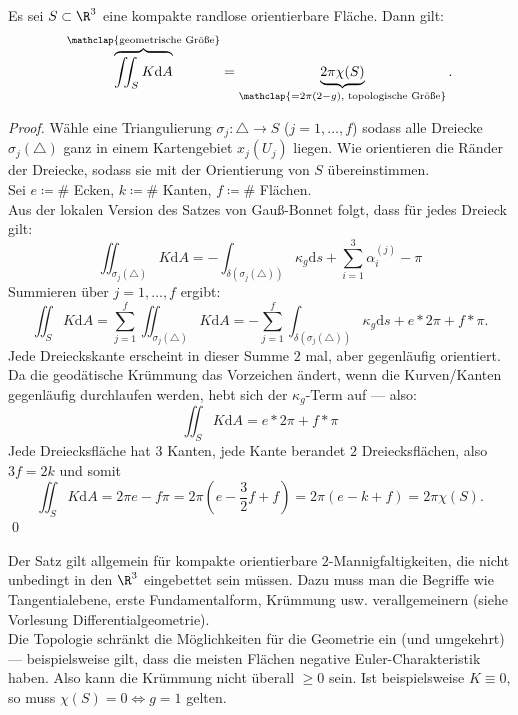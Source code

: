 \begin{theorem}
  Es sei \( S \subset \R^3 \) eine kompakte randlose orientierbare Fläche. Dann gilt:
  \begin{equation*}
    \overbrace{\iint_SK\text{d}A}^{\mathclap{\text{geometrische Größe}}} = \underbrace{2\pi\chi(S)}_{\mathclap{=2\pi(2-g)\text{, topologische Größe}}}\text{.}
  \end{equation*}
  \begin{proof}
    Wähle eine Triangulierung \( \sigma_j: \triangle \to S \) (\( j = 1,\dots,f \)) sodass alle Dreiecke \( \sigma_j(\triangle) \) ganz in einem Kartengebiet \( x_j(U_j) \) liegen. Wie orientieren die Ränder der Dreiecke, sodass sie mit der Orientierung von \( S \) übereinstimmen. \\
    Sei \( e \coloneqq \# \) Ecken, \( k \coloneqq \# \) Kanten, \( f \coloneqq \# \) Flächen. \\
    Aus der lokalen Version des Satzes von Gauß-Bonnet folgt, dass für jedes Dreieck gilt:
    \begin{equation*}
      \iint_{\sigma_j(\triangle)}K\text{d}A = -\int_{\delta(\sigma_j(\triangle))}\kappa_g\text{d}s + \sum_{i = 1}^3 \alpha_i^{(j)} - \pi
    \end{equation*}
    Summieren über \( j = 1,\dots,f \) ergibt:
    \begin{equation*}
      \iint_S K\text{d}A = \sum_{j=1}^f\iint_{\sigma_j(\triangle)}K\text{d}A = -\sum_{j=1}^f\int_{\delta(\sigma_j(\triangle))}\kappa_g\text{d}s + e*2\pi + f*\pi \text{.}
    \end{equation*}
    Jede Dreieckskante erscheint in dieser Summe \( 2 \) mal, aber gegenläufig orientiert. Da die geodätische Krümmung das Vorzeichen ändert, wenn die Kurven/Kanten gegenläufig durchlaufen werden, hebt sich der \( \kappa_g \)-Term auf --- also:
    \begin{equation*}
      \iint_SK\text{d}A = e*2\pi + f*\pi
    \end{equation*}
    Jede Dreiecksfläche hat \( 3 \) Kanten, jede Kante berandet \( 2 \) Dreiecksflächen, also \( 3f = 2k \) und somit
    \begin{equation*}
      \iint_SK\text{d}A = 2\pi e - f\pi = 2\pi(e - \frac{3}{2}f + f) = 2\pi(e-k+f) = 2\pi\chi(S)\text{.}
    \end{equation*} \qed
  \end{proof}
\end{theorem}

\begin{remark}
  Der Satz gilt allgemein für kompakte orientierbare \( 2 \)-Mannigfaltigkeiten, die nicht unbedingt in den \( \R^3 \) eingebettet sein müssen. Dazu muss man die Begriffe wie Tangentialebene, erste Fundamentalform, Krümmung usw. verallgemeinern (siehe Vorlesung Differentialgeometrie). \\
  Die Topologie schränkt die Möglichkeiten für die Geometrie ein (und umgekehrt) --- beispielsweise gilt, dass die meisten Flächen negative Euler-Charakteristik haben. Also kann die Krümmung nicht überall \( \geq 0 \) sein. Ist beispielsweise \( K \equiv 0 \), so muss \( \chi(S) = 0 \Leftrightarrow g = 1 \) gelten.
\end{remark}

